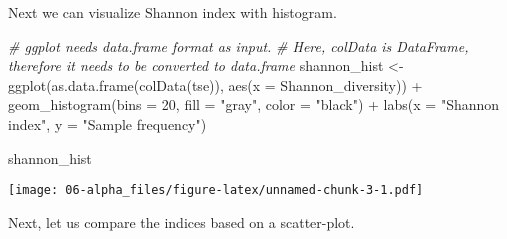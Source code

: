 \documentclass[
  oneside]{book}
\newenvironment{Shaded}{\begin{snugshade}}{\end{snugshade}}
\newcommand{\AttributeTok}[1]{\textcolor[rgb]{0.77,0.63,0.00}{#1}}
\newcommand{\CommentTok}[1]{\textcolor[rgb]{0.56,0.35,0.01}{\textit{#1}}}
\newcommand{\DecValTok}[1]{\textcolor[rgb]{0.00,0.00,0.81}{#1}}
\newcommand{\FunctionTok}[1]{\textcolor[rgb]{0.00,0.00,0.00}{#1}}
\newcommand{\NormalTok}[1]{#1}
\newcommand{\OtherTok}[1]{\textcolor[rgb]{0.56,0.35,0.01}{#1}}
\newcommand{\SpecialCharTok}[1]{\textcolor[rgb]{0.00,0.00,0.00}{#1}}
\newcommand{\StringTok}[1]{\textcolor[rgb]{0.31,0.60,0.02}{#1}}
\begin{document}
\begin{table}
\centering
{}
\end{table}

Next we can visualize Shannon index with histogram.

\begin{Shaded}
\begin{Highlighting}[]
\CommentTok{\# ggplot needs data.frame format as input.}
\CommentTok{\# Here, colData is DataFrame, therefore it needs to be converted to data.frame}
\NormalTok{shannon\_hist }\OtherTok{\textless{}{-}} \FunctionTok{ggplot}\NormalTok{(}\FunctionTok{as.data.frame}\NormalTok{(}\FunctionTok{colData}\NormalTok{(tse)), }
                       \FunctionTok{aes}\NormalTok{(}\AttributeTok{x =}\NormalTok{ Shannon\_diversity)) }\SpecialCharTok{+} 
  \FunctionTok{geom\_histogram}\NormalTok{(}\AttributeTok{bins =} \DecValTok{20}\NormalTok{, }\AttributeTok{fill =} \StringTok{"gray"}\NormalTok{, }\AttributeTok{color =} \StringTok{"black"}\NormalTok{) }\SpecialCharTok{+}
  \FunctionTok{labs}\NormalTok{(}\AttributeTok{x =} \StringTok{"Shannon index"}\NormalTok{, }\AttributeTok{y =} \StringTok{"Sample frequency"}\NormalTok{)}

\NormalTok{shannon\_hist}
\end{Highlighting}
\end{Shaded}

\texttt{[image: 06-alpha\_files/figure-latex/unnamed-chunk-3-1.pdf]}

Next, let us compare the indices based on a scatter-plot.
\end{document}
